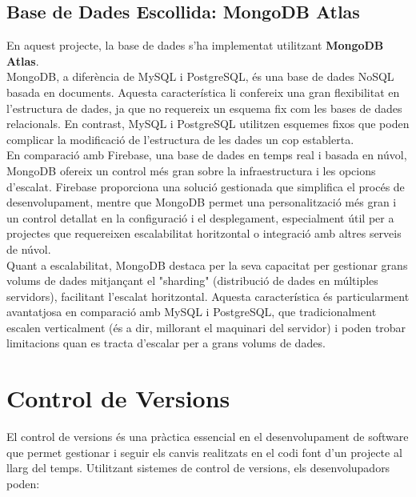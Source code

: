 \documentclass[a4paper,12pt,twoside]{ThesisStyle}
\begin{document}
\subsection{Base de Dades Escollida: MongoDB Atlas}
\label{Base de Dades Escollida: MongoDB Atlas}


En aquest projecte, la base de dades s'ha implementat utilitzant \textbf{MongoDB Atlas}.\\

MongoDB, a diferència de MySQL i PostgreSQL, és una base de dades NoSQL basada en documents. Aquesta característica li confereix una gran flexibilitat en l'estructura de dades, ja que no requereix un esquema fix com les bases de dades relacionals. En contrast, MySQL i PostgreSQL utilitzen esquemes fixos que poden complicar la modificació de l'estructura de les dades un cop establerta.\\

En comparació amb Firebase, una base de dades en temps real i basada en núvol, MongoDB ofereix un control més gran sobre la infraestructura i les opcions d'escalat. Firebase proporciona una solució gestionada que simplifica el procés de desenvolupament, mentre que MongoDB permet una personalització més gran i un control detallat en la configuració i el desplegament, especialment útil per a projectes que requereixen escalabilitat horitzontal o integració amb altres serveis de núvol.\\

Quant a escalabilitat, MongoDB destaca per la seva capacitat per gestionar grans volums de dades mitjançant el "sharding" (distribució de dades en múltiples servidors), facilitant l'escalat horitzontal. Aquesta característica és particularment avantatjosa en comparació amb MySQL i PostgreSQL, que tradicionalment escalen verticalment (és a dir, millorant el maquinari del servidor) i poden trobar limitacions quan es tracta d'escalar per a grans volums de dades.


\section{Control de Versions}

El control de versions és una pràctica essencial en el desenvolupament de software que permet gestionar i seguir els canvis realitzats en el codi font d'un projecte al llarg del temps. Utilitzant sistemes de control de versions, els desenvolupadors poden:
\end{document}
